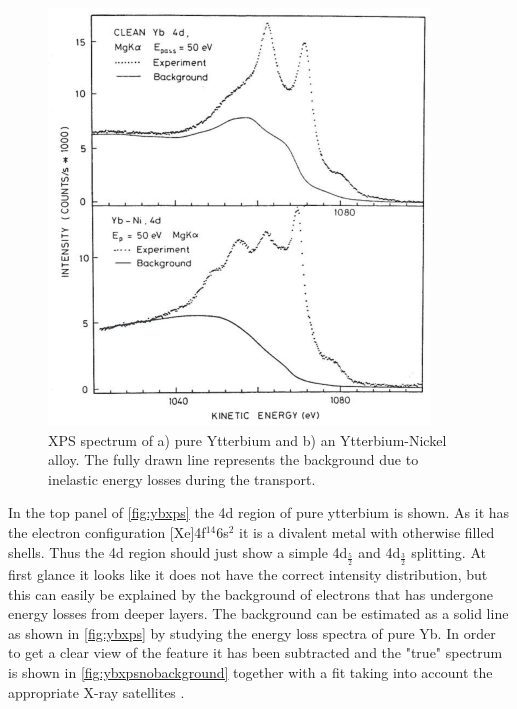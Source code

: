 \begin{figure}[h!]
	\begin{center}
	\includegraphics[scale=4.5]{figures/04_10.png}
	\caption{XPS spectrum of a) pure Ytterbium and b) an Ytterbium-Nickel alloy. The fully drawn line represents the background due to inelastic energy losses during the transport.}
	\label{fig:ybxps}
	\end{center}
\end{figure}

In the top panel of \autoref{fig:ybxps} the 4d region of pure ytterbium is shown. As it  has the electron configuration [Xe]4f$^{14}$6s$^{2}$ it is a divalent metal with  otherwise filled shells. Thus the 4d region should just show a simple 4d$_{\frac{5}{2}}$ and 4d$_{\frac{3}{2}}$  splitting. At first glance it looks like it does not have the correct intensity distribution, but this can easily be explained by the background of electrons that has undergone energy losses from deeper layers. The background can be estimated as a solid line as shown in \autoref{fig:ybxps} by studying the energy loss spectra of pure Yb. In order to get a clear view of the feature it has been subtracted and the "true" spectrum  is shown in \autoref{fig:ybxpsnobackground} together with a fit taking into account the appropriate X-ray satellites \cite{chorkendorff}.

